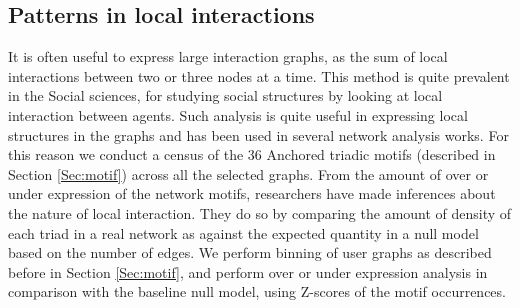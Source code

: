 \subsection{Patterns in local interactions}
It is often useful to express large interaction graphs, as the sum of local interactions between two or three nodes at a time. This method is quite prevalent in the Social sciences, for studying social structures by looking at local interaction between agents\cite{faust20077}. Such analysis is quite useful in expressing local structures in the graphs and has been used in several network analysis works\cite{wang2014triadic,shizuka2015network}.
For this reason we conduct a census of the 36 Anchored triadic motifs (described in Section \ref{Sec:motif}) across all the selected graphs. From the amount of over or under expression of the network motifs, researchers have made inferences about the nature of local interaction. They do so by comparing the amount of density of each triad in a real network as against the expected quantity in a null model based on the number of edges\cite{faust20077}. 
We perform binning of user graphs as described before in Section \ref{Sec:motif}, and perform over or under expression analysis in comparison with the baseline null model, using Z-scores of the motif occurrences.



